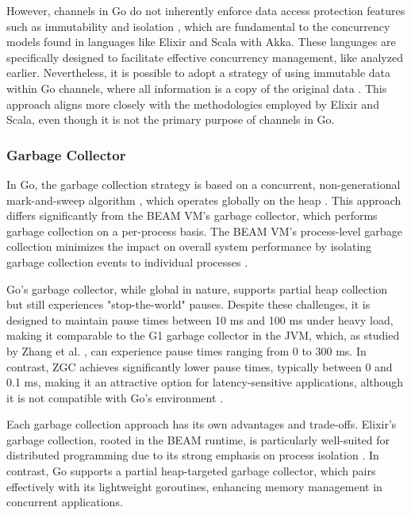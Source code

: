 However, channels in Go do not inherently enforce data access protection features such as immutability and isolation \cite{Kennedy2016}, which are fundamental to the concurrency models found in languages like Elixir and Scala with Akka. These languages are specifically designed to facilitate effective concurrency management, like analyzed earlier. Nevertheless, it is possible to adopt a strategy of using immutable data within Go channels, where all information is a copy of the original data \cite{Cox-Buday2017}. This approach aligns more closely with the methodologies employed by Elixir and Scala, even though it is not the primary purpose of channels in Go.

\subsubsection{Garbage Collector}

In Go, the garbage collection strategy is based on a concurrent, non-generational mark-and-sweep algorithm \cite{go-docs}, which operates globally on the heap \cite{Zhao2023}. This approach differs significantly from the BEAM VM's garbage collector, which performs garbage collection on a per-process basis. The BEAM VM’s process-level garbage collection minimizes the impact on overall system performance by isolating garbage collection events to individual processes \cite{Juric2024}.

Go's garbage collector, while global in nature, supports partial heap collection but still experiences "stop-the-world" pauses. Despite these challenges, it is designed to maintain pause times between 10 ms and 100 ms under heavy load, making it comparable to the G1 garbage collector in the JVM, which, as studied by Zhang et al. \cite{Zhang2021}, can experience pause times ranging from 0 to 300 ms. In contrast, ZGC achieves significantly lower pause times, typically between 0 and 0.1 ms, making it an attractive option for latency-sensitive applications, although it is not compatible with Go's environment \cite{Castro2019}.

Each garbage collection approach has its own advantages and trade-offs. Elixir’s garbage collection, rooted in the BEAM runtime, is particularly well-suited for distributed programming due to its strong emphasis on process isolation \cite{Armstrong2013}. In contrast, Go supports a partial heap-targeted garbage collector, which pairs effectively with its lightweight goroutines, enhancing memory management in concurrent applications.

